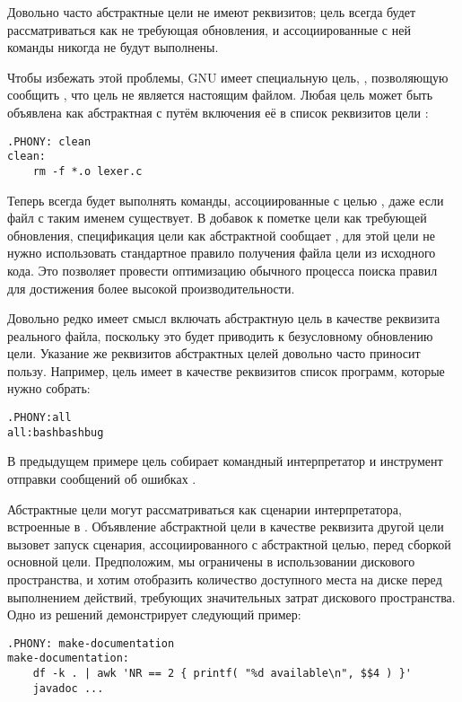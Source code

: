 Довольно часто абстрактные цели не имеют реквизитов; цель
 всегда будет рассматриваться как не требующая
обновления, и ассоциированные с ней команды никогда не будут
выполнены.

Чтобы избежать этой проблемы, GNU \GNUmake{} имеет специальную цель,
, позволяющую сообщить \GNUmake{}, что цель не является
настоящим файлом. Любая цель может быть объявлена как абстрактная с
путём включения её в список реквизитов цели :

{\footnotesize
\begin{verbatim}
.PHONY: clean
clean: 
    rm -f *.o lexer.c
\end{verbatim}
}

Теперь \GNUmake{} всегда будет выполнять команды, ассоциированные с
целью , даже если файл с таким именем существует. В
добавок к пометке цели как требующей обновления, спецификация цели как
абстрактной сообщает \GNUmake{}, для этой цели не нужно использовать
стандартное правило получения файла цели из исходного кода. Это
позволяет \GNUmake{} провести оптимизацию обычного процесса поиска
правил для достижения более высокой производительности.

Довольно редко имеет смысл включать абстрактную цель в качестве
реквизита реального файла, поскольку это будет приводить к
безусловному обновлению цели. Указание же реквизитов абстрактных целей
довольно часто приносит пользу. Например, цель  имеет в
качестве реквизитов список программ, которые нужно собрать:

\begin{alltt}
.PHONY: all
all: bash bashbug
\end{alltt}

В предыдущем примере цель  собирает командный
интерпретатор  и инструмент отправки сообщений об
ошибках .

Абстрактные цели могут рассматриваться как сценарии интерпретатора,
встроенные в \Makefile{}. Объявление абстрактной цели в качестве
реквизита другой цели вызовет запуск сценария, ассоциированного с
абстрактной целью, перед сборкой основной цели. Предположим, мы
ограничены в использовании дискового пространства, и хотим отобразить
количество доступного места на диске перед выполнением действий,
требующих значительных затрат дискового пространства. Одно из решений
демонстрирует следующий пример:

{\footnotesize
\begin{verbatim}
.PHONY: make-documentation
make-documentation:
    df -k . | awk 'NR == 2 { printf( "%d available\n", $$4 ) }'
    javadoc ...
\end{verbatim}
}

